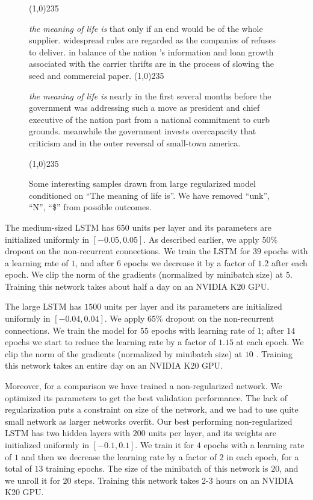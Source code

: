 \documentclass{article}
\begin{document}
\begin{figure}
\line(1,0){235}

  {\footnotesize
  \textit{the meaning of life is} that only if an end would be of the whole supplier. widespread rules are regarded as the companies of refuses to deliver. in balance of the nation 's information and loan growth associated with the carrier thrifts are in the process of slowing the seed and commercial paper.}
\line(1,0){235}

  {\footnotesize
\textit{the meaning of life is} nearly in the first several months before the government was addressing such a move as president and chief executive of the nation past from a national commitment to curb grounds. meanwhile the government invests overcapacity that criticism and in the outer reversal of small-town america.}

\line(1,0){235}
  \caption{Some interesting samples drawn from large regularized model conditioned on ``The meaning of life is''. We have removed ``unk'', ``N'', ``\$'' from possible outcomes.}
  \label{fig:meaning}
\end{figure}

The medium-sized LSTM has $650$ units per layer
and its parameters are initialized uniformly in $[-0.05,
  0.05]$. As described earlier, we apply $50\%$ dropout on the non-recurrent connections. We
train the LSTM for $39$ epochs with a learning rate of $1$, and after
$6$ epochs we decrease it by a factor of $1.2$ after each epoch. We
clip the norm of the gradients (normalized by minibatch size) at $5$. 
Training this network takes about half a day on an NVIDIA K20 GPU. 

The large LSTM has $1500$ units per layer and its parameters are
initialized uniformly in $[-0.04, 0.04]$. We apply $65\%$ dropout on
the non-recurrent connections. We train the model for $55$ epochs with
learning rate of $1$;  after $14$ epochs we start to reduce the learning rate by a
factor of $1.15$ at each epoch. We clip the norm of
the gradients (normalized by minibatch size) at $10$ \cite{mikolov2010recurrent}. Training this
network takes an entire day on an NVIDIA K20 GPU.

Moreover, for a comparison we have trained a non-regularized network. 
We optimized its parameters to get the best validation performance.
The lack of regularization
puts a constraint on size of the network, and we had to use quite small network as larger networks overfit. 
Our best performing non-regularized LSTM has two hidden layers with $200$ units per layer, and its weights are initialized
uniformly in $[-0.1, 0.1]$.
We train it for $4$ epochs 
with a learning rate of $1$ and then we decrease the learning rate by a factor of $2$ in each epoch, for a total of $13$ training epochs.
The size of the minibatch of this network is $20$, and we unroll it for $20$ steps. Training this network takes 2-3 hours
on an NVIDIA K20 GPU.
\end{document}
